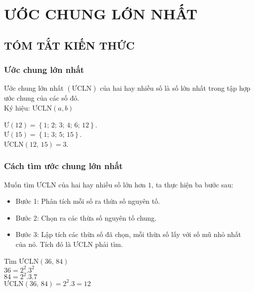 \section{ƯỚC CHUNG LỚN NHẤT}
\subsection{TÓM TẮT KIẾN THỨC}
\begin{tomtat}
	\subsubsection{Ước chung lớn nhất}
Ước chung lớn nhất $\left( \text{ƯCLN} \right)$ của hai hay nhiều số là số lớn nhất trong tập hợp ước chung của các số đó.\\
Ký hiệu: $\text{ƯCLN}\left( {a,b} \right)$\\
\begin{vd}
$\text{Ư}\left( {12} \right) = \left\{ {1;\,2;\,3;\,4;\,6;\,12} \right\}$.\\
$\text{Ư}\left( {15} \right) = \left\{ {1;\,3;\,5;\,15} \right\}$.\\
$\text{ƯCLN}\left( {12,\,15} \right) = 3$.
\end{vd}
	\subsubsection{Cách tìm ước chung lớn nhất}
Muốn tìm $\text{ƯCLN}$ của hai hay nhiều số lớn hơn $1$, ta thực hiện ba bước sau:
\begin{itemize}
\item Bước 1: Phân tích mỗi số ra thừa số nguyên tố.
\item Bước 2: Chọn ra các thừa số nguyên tố chung.
\item Bước 3: Lập tích các thừa số đã chọn, mỗi thừa số lấy với số mũ nhỏ nhất của nó. Tích đó là $\text{ƯCLN}$ phải tìm.
\end{itemize}
\begin{vd} Tìm $\text{ƯCLN}\left( {36,\,84} \right)$\\
$36 = 2^2 . 3^2$\\
$84 = 2^2 . 3 . 7$\\
$\text{ƯCLN}\left( {36,\,84} \right) = 2^2 . 3 = 12$
\end{vd}

\end{tomtat}

